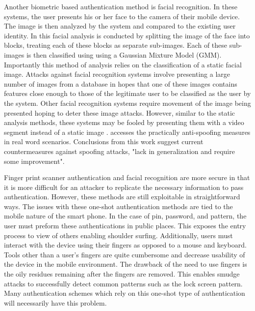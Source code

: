 Another biometric based authentication method
is facial recognition.
In these systems,
the user presents his or her face to the camera
of their mobile device.
%
The image is then 
analyzed by the system and compared to the existing user identity.
%
In \cite{mccool2009parts} this facial analysis
is conducted by 
splitting the image of the face into blocks,
treating each of these blocks as separate sub-images.
Each of these sub-images is then classified using
using a Gaussian Mixture Model (GMM).
%
Importantly this method of analysis relies on
the classification of a static facial image.
%
Attacks against facial recognition systems
involve presenting a large number of images from a database
in hopes that one of these images contains
features close enough to those of the legitimate user
to be classified as the user by the system.
%
Other facial recognition systems require movement of
the image being presented
hoping to deter these image attacks.
%
However, similar to the static analysis methods,
these systems may be fooled by
presenting them with a video segment
instead of a static image \cite{hadid2014face}. 
%
\cite{de2013can}
accesses the practically anti-spoofing measures in real word scenarios.
Conclusions from this work suggest
current countermeasures against spoofing attacks,
"lack in generalization and require some improvement".

Finger print scanner authentication and
facial recognition are more secure in 
that it is more difficult for an attacker to replicate
the necessary information to pass authentication.
%
However,
these methods are still exploitable in straightforward ways.
%
The issues with these one-shot authentication methods
are tied to the mobile nature of the smart phone.
%
In the case of pin, password, and pattern,
the user must preform these authentications in 
public places.
This exposes the entry process to view of others
enabling shoulder surfing.
%
Additionally,
users must interact with the device using their
fingers as opposed to a mouse and keyboard.
%
Tools other than a user's fingers are quite cumbersome
and decrease usability of the device in the mobile environment.
%
The drawback of the need to use fingers
is the oily residues remaining after the fingers are removed.
This enables smudge attacks to successfully detect
common patterns such as the lock screen pattern.
%
Many authentication schemes which rely on this one-shot
type of authentication will necessarily have this problem.

